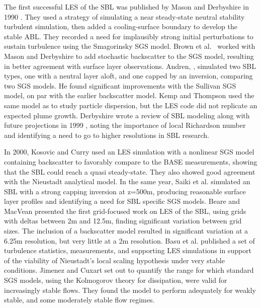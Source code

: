 \documentclass[conf]{new-aiaa}
\begin{document}
The first successful LES of the SBL was published by Mason and Derbyshire in
1990 \cite{Mason1990}. They used a strategy of simulating a near steady-state
neutral stability turbulent simulation, then added a cooling-surface boundary
to develop the stable ABL. They recorded a need for implausibly strong initial
perturbations to sustain turbulence using the Smagorinsky SGS model. Brown et
al.\ \cite{Brown1994} worked with Mason and Derbyshire to add stochastic backscatter
to the SGS model, resulting in better agreement with surface layer observations.
Andren, \cite{Andren1995}, simulated two SBL types, one with a neutral layer aloft, and
one capped by an inversion, comparing two SGS models. He found significant improvements
with the Sullivan SGS model, on par with the earlier backscatter model. Kemp and
Thompson \cite{Kemp1996} used the same model as \cite{Brown1994} to study particle
dispersion, but the LES code did not replicate an expected plume growth. Derbyshire
wrote a review of SBL modeling along with future projections in 1999 \cite{Derbyshire1999},
noting the importance of local Richardson number and identifying a need to go
to higher resolutions in SBL research.

In 2000, Kosovic and Curry \cite{Kosovic2000} used an LES simulation with a nonlinear SGS
model containing backscatter to favorably compare to the BASE measurements, showing that
the SBL could reach a quasi steady-state. They also showed good agreement with the Nieustadt
analytical model. In the same year, Saiki et al. \cite{Saiki2000} simulated an SBL with
a strong capping inversion at z=500m, producing reasonable surface layer profiles and
identifying a need for SBL specific SGS models. Beare and MacVean \cite{Beare2004}
presented the first grid-focused work on LES of the SBL, using grids with deltas
between 2m and 12.5m, finding significant variation between grid sizes. The inclusion
of a backscatter model resulted in significant variation at a 6.25m resolution, but
very little at a 2m resolution. Basu et al. \cite{Basu2005} published a set of
turbulence statistics, measurements, and supporting LES simulations in support
of the viability of Nieustadt's local scaling hypothesis under very stable
conditions. Jimenez and Cuxart \cite{Jimenez2005} set out to quantify the range
for which standard SGS models, using the Kolmogorov theory for dissipation, were
valid for increasingly stable flows. They found the model to perform adequately
for weakly stable, and some moderately stable flow regimes.
\end{document}
